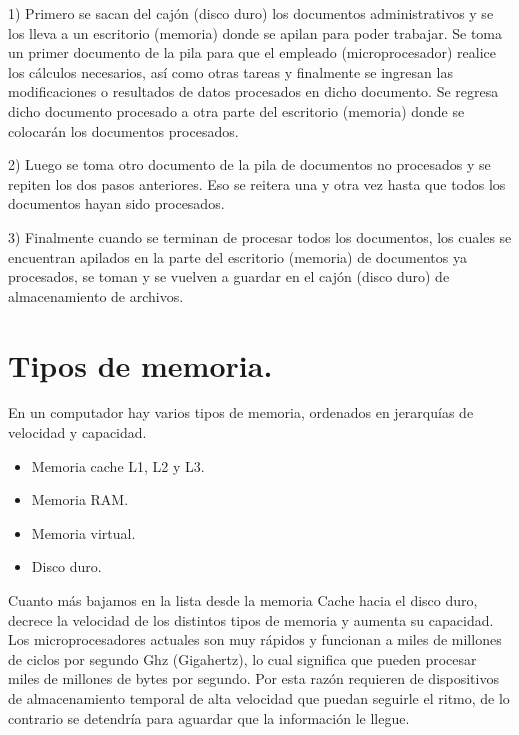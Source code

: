 \documentclass{article}
\begin{document}
 1) Primero se sacan del cajón (disco duro) los documentos administrativos y se los lleva a un escritorio (memoria) donde se apilan para poder trabajar. Se toma un primer documento de la pila para que el empleado (microprocesador) realice los cálculos necesarios, así como otras tareas y finalmente se ingresan las modificaciones o resultados de datos procesados en dicho documento. Se regresa dicho documento procesado a otra parte del escritorio (memoria) donde se colocarán los documentos procesados.
    
2) Luego se toma otro documento de la pila de documentos no procesados y se repiten los dos pasos anteriores. Eso se reitera una y otra vez hasta que todos los documentos hayan sido procesados.

3) Finalmente cuando se terminan de procesar todos los documentos, los cuales se encuentran apilados en la parte del escritorio (memoria) de documentos ya procesados, se toman y se vuelven a guardar en el cajón (disco duro) de almacenamiento de archivos. \cite{Desconocido}

\section{Tipos de memoria.} \label{contenido}
En un computador hay varios tipos de memoria, ordenados en jerarquías de velocidad y capacidad.

\begin{itemize}
    \item Memoria cache L1, L2 y L3.
    \item Memoria RAM.
    \item Memoria virtual.
    \item Disco duro. 
\end{itemize}
 

Cuanto más bajamos en la lista desde la memoria Cache hacia el disco duro, decrece la velocidad
de los distintos tipos de memoria y aumenta su capacidad.
Los microprocesadores actuales son muy rápidos y funcionan a miles de millones de ciclos por
segundo Ghz (Gigahertz), lo cual significa que pueden procesar miles de millones de bytes por
segundo. Por esta razón requieren de dispositivos de almacenamiento temporal de alta
velocidad que puedan seguirle el ritmo, de lo contrario se detendría para aguardar que la
información le llegue.\\
\end{document}
